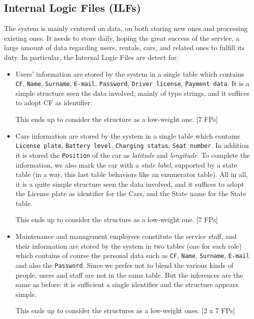 \documentclass{scrreprt}
\begin{document}
\subsection{Internal Logic Files (ILFs)}
The system is mainly centered on data, on both storing new ones and processing existing ones.
It needs to store daily, hoping the great success of the service, a large amount of data regarding users, rentals, cars, and related ones to fulfill its duty.
In particular, the Internal Logic Files are detect for:

\begin{itemize}
\item Users' information are stored by the system in a single table which contains \texttt{CF}, \texttt{Name}, \texttt{Surname}, \texttt{E-mail}, \texttt{Password}, \texttt{Driver license}, \texttt{Payment data}. It is a simple structure seen the data involved, mainly of type strings, and it suffices to adopt CF as identifier.

This ends up to consider the structure as a low-weight one. [7 FPs]

\item Cars information are stored by the system in a single table which contains \texttt{License plate}, \texttt{Battery level}, \texttt{Charging status}, \texttt{Seat number}. In addition it is stored the \texttt{Position} of the car as \emph{latitude} and \emph{longitude}. To complete the information, we also mark the car with a \emph{state label}, supported by a state table (in a way, this last table behaviors like an enumerator table). All in all, it is a quite simple structure seen the data involved, and it suffices to adopt the License plate as identifier for the Cars, and the State name for the State table.

This ends up to consider the structure as a low-weight one. [7 FPs]

\item Maintenance and management employees constitute the service staff, and their information are stored by the system in two tables (one for each role) which contains of course the personal data such as \texttt{CF}, \texttt{Name}, \texttt{Surname}, \texttt{E-mail} and also the \texttt{Password}. Since we prefer not to blend the various kinds of people, users and staff are not in the same table. But the inferences are the same as before: it is sufficient a single identifier and the structure appears simple.

This ends up to consider the structures as a low-weight ones. [2 x 7 FPs]


\end{itemize}
\end{document}
